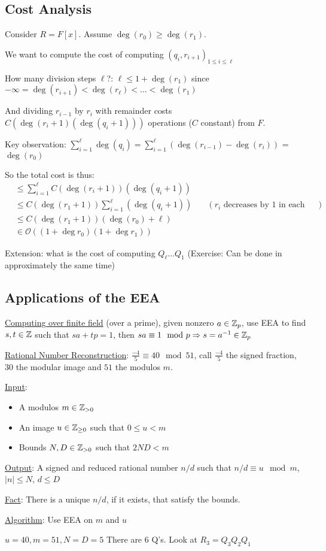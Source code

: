 \subsection{Cost Analysis}
Consider $R = F[x]$. Assume $\deg(r_0) \geq \deg(r_1)$.

We want to compute the cost of computing $(q_i, r_{i+1})_{1 \leq i \leq \ell}$

How many division steps $\ell$?: $\ell \leq 1 + \deg(r_1)$ since $-\infty = \deg(r_{i+1}) < \deg(r_\ell) < \ldots < \deg(r_1)$

And dividing $r_{i-1}$ by $r_i$ with remainder costs $C(\deg(r_i + 1)(\deg(q_i + 1)))$ operations ($C$ constant) from $F$.

Key observation: $\sum_{i = 1}^\ell \deg(q_i) = \sum_{i =1}^\ell \left(\deg(r_{i -1}) - \deg(r_i) \right)$ = $\deg(r_0)$

So the total cost is thus: 
\begin{align*}
    &\leq \sum_{i=1}^\ell C(\deg(r_i + 1))(\deg(q_i + 1)) \\
    &\leq C(\deg(r_1 + 1))\sum_{i=1}^\ell (\deg(q_i +1)) \quad &(r_i \text{ decreases by 1 in each iteration in the worst case}) \\
    &\leq C(\deg(r_1 + 1))(\deg(r_0) + \ell) \\
    &\in \mathcal{O}((1 + \deg r_0)(1 + \deg r_1))
\end{align*}

Extension: what is the cost of computing $Q_\ell \ldots Q_1$ (Exercise: Can be done in approximately the same time)

\subsection{Applications of the EEA}
\underline{Computing over finite field} (over a prime), given nonzero $a \in \mathbb{Z}_p$, use EEA to find $s,t \in \mathbb{Z}$ such that $sa + tp = 1$, then $sa \equiv 1 \mod p \Rightarrow s = a^{-1} \in \mathbb{Z}_p$


\underline{Rational Number Reconstruction}:
$\frac{-4}{5} \equiv 40 \mod 51$, call $\frac{-4}{5}$ the signed fraction, $30$ the modular image and $51$ the modulos $m$.

\underline{Input}:
\begin{itemize}
    \item A modulos $m \in \mathbb{Z}_{> 0}$
    \item An image $u \in \mathbb{Z}_{\geq 0}$ such that $0 \leq u < m$
    \item Bounds $N, D \in \mathbb{Z}_{> 0}$ such that $2ND < m$
\end{itemize}

\underline{Output}: A signed and reduced rational number $n/d$ such that $n/d \equiv u \mod m$, $|n| \leq N$, $d \leq D$

\underline{Fact}: There is a unique $n/d$, if it exists, that satisfy the bounds.

\underline{Algorithm}: Use EEA on $m$ and $u$ 
\begin{example}
    $u = 40, m = 51, N = D = 5$
    There are $6$ Q's. Look at $R_3 = Q_3Q_2Q_1$

\end{example}

\newpage